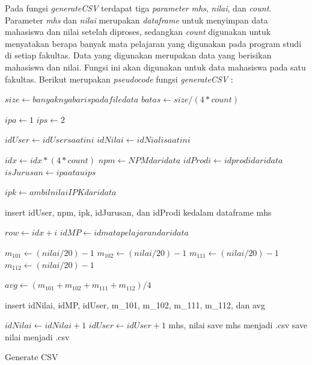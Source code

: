Pada fungsi \textit{generateCSV} terdapat tiga \textit{parameter} \textit{mhs}, \textit{nilai}, dan \textit{count}. Parameter \textit{mhs} dan \textit{nilai} merupakan \textit{dataframe} untuk menyimpan data mahasiswa dan nilai setelah diproses, sedangkan \textit{count} digunakan untuk menyatakan berapa banyak mata pelajaran yang digunakan pada program studi di setiap fakultas. Data yang digunakan merupakan data yang berisikan mahasiswa dan nilai. Fungsi ini akan digunakan untuk data mahasiswa pada satu fakultas. Berikut merupakan \textit{pseudocode} fungsi \textit{generateCSV} : 

\begin{algorithm}[H]
  \begin{algorithmic}[1]
        \State $size \gets banyaknya baris pada file data$
        \State $batas \gets size/(4*count)$ 
        
        \State $ipa \gets 1$ 
        \State $ips \gets 2$ 
        
        \State $idUser \gets idUser saat ini$
        \State $idNilai \gets idNiali saat ini$
        
            \State $idx \gets idx*(4*count)$
            \State $npm \gets NPM dari data$
            \State $idProdi \gets id prodi dari data$
            \State $isJurusan \gets ipa atau ips$ 
            
                \State $ipk \gets ambil nilai IPK dari data$ 
            \EndFor
            
            \State insert idUser, npm, ipk, idJurusan, dan idProdi kedalam dataframe mhs
            
                \State $row \gets idx+i$
                \State $idMP \gets id mata pelajaran dari data$
                
                \State $m_101 \gets (nilai/20)-1$ 
                \State $m_102 \gets (nilai/20)-1$ 
                \State $m_111 \gets (nilai/20)-1$ 
                \State $m_112 \gets (nilai/20)-1$ 
                
                \State $avg \gets (m_101+m_102+m_111+m_112)/4$
                
                \State insert idNilai, idMP, idUser, m\_101, m\_102, m\_111, m\_112, dan avg
                
                \State $idNilai \gets idNilai+1$
            \EndFor
            \State $idUser \gets idUser+1$
        \EndFor
        \State \Return mhs, nilai
    \EndProcedure
    \State save mhs menjadi .csv
    \State save nilai menjadi .csv
  \end{algorithmic} 
  \caption{Generate CSV}
  \label{alg:generateCSV}
\end{algorithm}

